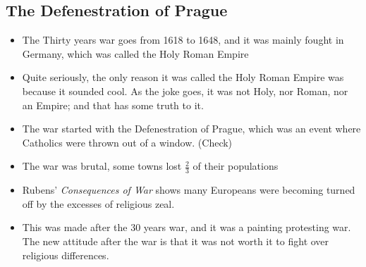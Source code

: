 \documentclass{article}
\begin{document}
\begin{spacing}{1.2}
    \subsection{The Defenestration of Prague}
    \begin{itemize}
        \item The Thirty years war goes from 1618 to 1648, and it was mainly
            fought in Germany, which was called the Holy Roman Empire
        \item Quite seriously, the only reason it was called the Holy Roman
            Empire was because it sounded cool. As the joke goes, it was not Holy,
            nor Roman, nor an Empire; and that has some truth to it.
        \item The war started with the Defenestration of Prague, which was an
            event where Catholics were thrown out of a window. (Check)
        \item The war was brutal, some towns lost \(\frac{2}{3}\) of their
            populations
        \item Rubens' \textit{Consequences of War} shows many Europeans were becoming turned off by the excesses of religious zeal.
        \item This was made after the 30 years war, and it was a painting protesting war. The new attitude after the war is that it was not worth it to fight over religious differences.
    \end{itemize}

\end{spacing}
\end{document}
